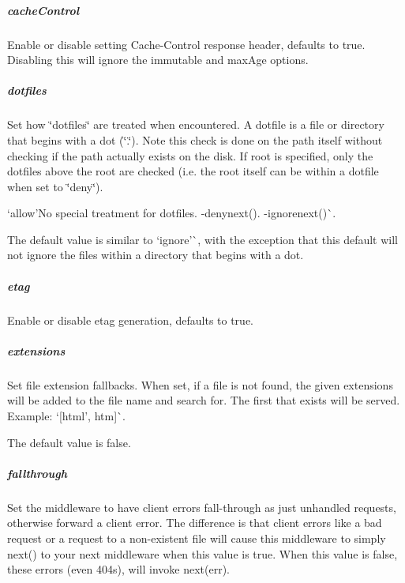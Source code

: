 \subparagraph*{cache\+Control}

Enable or disable setting {\ttfamily Cache-\/\+Control} response header, defaults to true. Disabling this will ignore the {\ttfamily immutable} and {\ttfamily max\+Age} options.

\subparagraph*{dotfiles}

Set how \char`\"{}dotfiles\char`\"{} are treated when encountered. A dotfile is a file or directory that begins with a dot (\char`\"{}.\char`\"{}). Note this check is done on the path itself without checking if the path actually exists on the disk. If {\ttfamily root} is specified, only the dotfiles above the root are checked (i.\+e. the root itself can be within a dotfile when set to \char`\"{}deny\char`\"{}).


\begin{DoxyItemize}
\item `\textquotesingle{}allow'{\ttfamily No special treatment for dotfiles. -\/}\textquotesingle{}denynext(){\ttfamily . -\/}\textquotesingle{}ignorenext()\`{}.
\end{DoxyItemize}

The default value is similar to `\textquotesingle{}ignore'\`{}, with the exception that this default will not ignore the files within a directory that begins with a dot.

\subparagraph*{etag}

Enable or disable etag generation, defaults to true.

\subparagraph*{extensions}

Set file extension fallbacks. When set, if a file is not found, the given extensions will be added to the file name and search for. The first that exists will be served. Example\+: `\mbox{[}\textquotesingle{}html', \textquotesingle{}htm\textquotesingle{}\mbox{]}\`{}.

The default value is {\ttfamily false}.

\subparagraph*{fallthrough}

Set the middleware to have client errors fall-\/through as just unhandled requests, otherwise forward a client error. The difference is that client errors like a bad request or a request to a non-\/existent file will cause this middleware to simply {\ttfamily next()} to your next middleware when this value is {\ttfamily true}. When this value is {\ttfamily false}, these errors (even 404s), will invoke {\ttfamily next(err)}.

